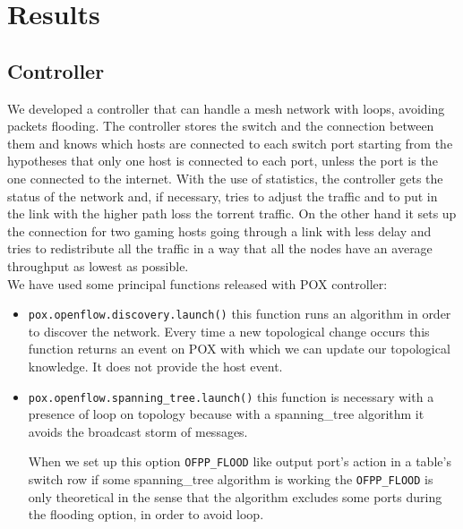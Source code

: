 \documentclass[article,10pt]{IEEEtran}
\begin{document}
\section{Results}\label{sec:results}
\subsection{Controller}
We developed a controller that can handle a mesh network with loops, avoiding
packets flooding. The controller stores the switch and the connection between them and knows which hosts are connected to each switch port starting from the hypotheses that only one
host is connected to each port, unless the port is the one connected to the internet.
With the use of statistics, the controller gets the status of the network and, if necessary,
tries to adjust the traffic and to put in the link with the higher path loss the torrent traffic.
On the other hand it sets up the connection for two gaming hosts going through a link with less delay and tries to redistribute all the 
traffic in a way that all the nodes have an average throughput as lowest as possible.
\\
\newline
We have used some principal functions released with POX controller:
\begin{itemize}
 \item \texttt{pox.openflow.discovery.launch()} this function runs an algorithm in order to discover the network. Every time a new
 topological change occurs this function returns an event on POX with which we can update our topological knowledge.
 It does not provide the host event\cite{pox}.
 \item \texttt{pox.openflow.spanning_tree.launch()} this function is necessary with a presence of loop on topology
 because with a spanning_tree algorithm it avoids the broadcast storm of messages.
 
When we set up this option \texttt{OFPP_FLOOD} like output port's action in a table's switch row if some spanning_tree algorithm is working
the \texttt{OFPP_FLOOD} is only theoretical in the sense that the algorithm excludes some ports during the flooding option, in order to avoid loop\cite{pox}.
\end{itemize}
\end{document}
